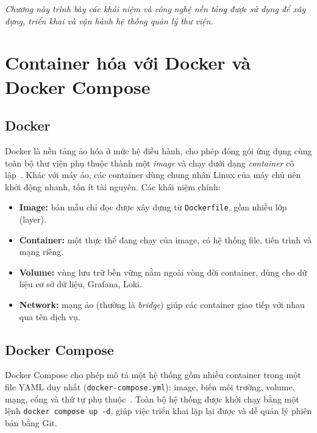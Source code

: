 \documentclass[../main.tex]{subfiles}
\begin{document}
\textit{Chương này trình bày các khái niệm và công nghệ nền tảng được sử dụng để xây dựng, triển khai và vận hành hệ thống quản lý thư viện.}

\section{Container hóa với Docker và Docker Compose}
\subsection{Docker}
Docker là nền tảng ảo hóa ở mức hệ điều hành, cho phép đóng gói ứng dụng cùng toàn bộ thư viện phụ thuộc thành một \textit{image} và chạy dưới dạng \textit{container} cô lập~\cite{docker-docs}. Khác với máy ảo, các container dùng chung nhân Linux của máy chủ nên khởi động nhanh, tốn ít tài nguyên. Các khái niệm chính:
\begin{itemize}
    \item \textbf{Image:} bản mẫu chỉ đọc được xây dựng từ \texttt{Dockerfile}, gồm nhiều lớp (layer).
    \item \textbf{Container:} một thực thể đang chạy của image, có hệ thống file, tiến trình và mạng riêng.
    \item \textbf{Volume:} vùng lưu trữ bền vững nằm ngoài vòng đời container, dùng cho dữ liệu cơ sở dữ liệu, Grafana, Loki.
    \item \textbf{Network:} mạng ảo (thường là \textit{bridge}) giúp các container giao tiếp với nhau qua tên dịch vụ.
\end{itemize}

\subsection{Docker Compose}
Docker Compose cho phép mô tả một hệ thống gồm nhiều container trong một file YAML duy nhất (\texttt{docker-compose.yml}): image, biến môi trường, volume, mạng, cổng và thứ tự phụ thuộc~\cite{compose-docs}. Toàn bộ hệ thống được khởi chạy bằng một lệnh \texttt{docker compose up -d}, giúp việc triển khai lặp lại được và dễ quản lý phiên bản bằng Git.
\end{document}
